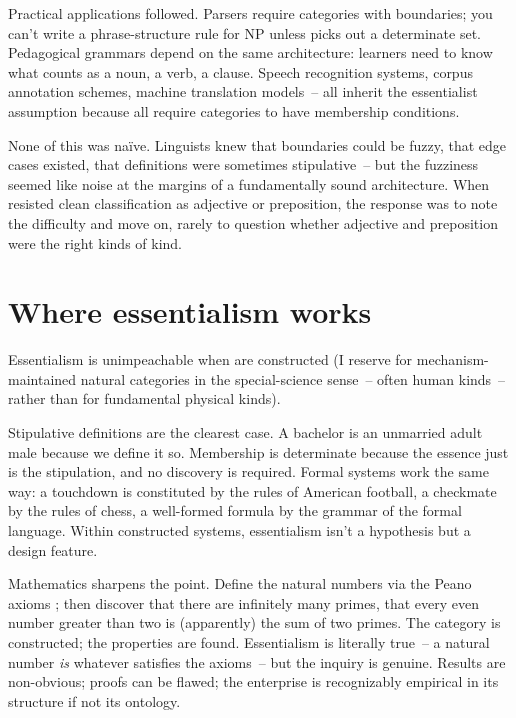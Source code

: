 Practical applications followed. Parsers require categories with boundaries; you can't write a phrase-structure rule for NP unless  picks out a determinate set. Pedagogical grammars depend on the same architecture: learners need to know what counts as a noun, a verb, a clause. Speech recognition systems, corpus annotation schemes, machine translation models~-- all inherit the essentialist assumption because all require categories to have membership conditions.

None of this was naïve. Linguists knew that boundaries could be fuzzy, that edge cases existed, that definitions were sometimes stipulative~-- but the fuzziness seemed like noise at the margins of a fundamentally sound architecture. When  resisted clean classification as adjective or preposition, the response was to note the difficulty and move on, rarely to question whether adjective and preposition were the right kinds of kind.

\section{Where essentialism works}
\label{sec:2:where-essentialism-works}

Essentialism is unimpeachable when  are constructed (I reserve  for mechanism-maintained natural categories in the special-science sense~-- often human kinds~-- rather than for fundamental physical kinds).

Stipulative definitions are the clearest case. A bachelor is an unmarried adult male because we define it so. Membership is determinate because the essence just is the stipulation, and no discovery is required. Formal systems work the same way: a touchdown is constituted by the rules of American football, a checkmate by the rules of chess, a well-formed formula by the grammar of the formal language. Within constructed systems, essentialism isn't a hypothesis but a design feature.

Mathematics sharpens the point. Define the natural numbers via the Peano axioms \autocite{peano1889}; then discover that there are infinitely many primes, that every even number greater than two is (apparently) the sum of two primes. The category is constructed; the properties are found. Essentialism is literally true~-- a natural number \emph{is} whatever satisfies the axioms~-- but the inquiry is genuine. Results are non-obvious; proofs can be flawed; the enterprise is recognizably empirical in its structure if not its ontology.

